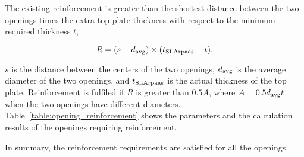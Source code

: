 The existing reinforcement is greater than the shortest distance 
between the two openings times the extra top plate thickness
with respect to the minimum required thickness $t$,

\begin{equation}
    R = (s - d_{\text{avg}})\times(t_{\text{SLArpaas}}-t).
\end{equation}

$s$ is the distance between the centers of the two openings,
$d_{\text{avg}}$ is the average diameter of the two openings,
and $t_{\text{SLArpaas}}$ is the actual thickness of the top plate.
Reinforcement is fulfiled if $R$ is greater than $0.5A$,
where $A = 0.5d_{\text{avg}} t$ when the two openings have different 
diameters.
Table~\ref{table:opening_reinforcement} shows the parameters
and the calculation results of the openings requiring 
reinforcement.



In summary, the reinforcement requirements are satisfied for
all the openings.
